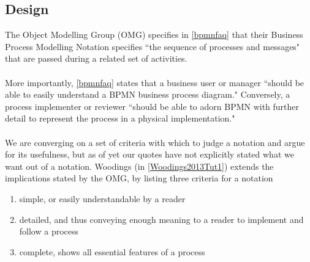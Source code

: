 \subsection{Design}

The Object Modelling Group (OMG) specifies in \ref{bpmnfaq} that their Business Process Modelling Notation
specifies ``the sequence of processes and messages" that are passed during a related set of
activities.\\
\\
More importantly, \ref{bpmnfaq} states that a business user or manager ``should be able to easily
understand a BPMN business process diagram."
Conversely, a process implementer or reviewer ``should be able to adorn BPMN with further detail to
represent the process in a physical implementation."\\
\\
We are converging on a set of criteria with which to judge a notation and argue for its usefulness,
but as of yet our quotes have not explicitly stated what we want out of a notation.
Woodings (in \ref{Woodings2013Tut1}) extends the implications stated by the OMG, by listing three criteria for a notation
\begin{enumerate}
	\item simple, or easily understandable by a reader \label{simpleNot}
	\item detailed, and thus conveying enough meaning to a reader to implement and follow
	a process \label{detailedNot}
	\item complete, shows all essential features of a process \label{completeNot}
\end{enumerate}


